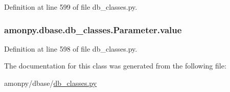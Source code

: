Definition at line 599 of file db\-\_\-classes.\-py.

\hypertarget{classamonpy_1_1dbase_1_1db__classes_1_1_parameter_ac077e0db5b88e49166cd5066a1ffafe7}{
\subsubsection[{value}]{\setlength{\rightskip}{0pt plus 5cm}amonpy.\-dbase.\-db\-\_\-classes.\-Parameter.\-value}}\label{classamonpy_1_1dbase_1_1db__classes_1_1_parameter_ac077e0db5b88e49166cd5066a1ffafe7}


Definition at line 598 of file db\-\_\-classes.\-py.



The documentation for this class was generated from the following file\-:\begin{DoxyCompactItemize}
\item 
amonpy/dbase/\hyperlink{db__classes_8py}{db\-\_\-classes.\-py}\end{DoxyCompactItemize}
